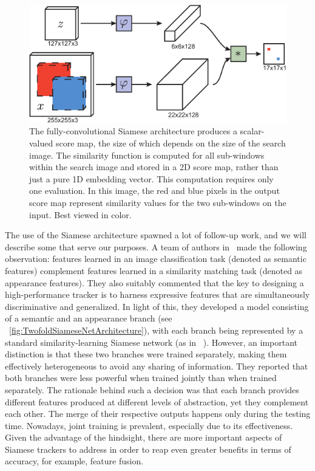 \begin{figure}[t]
    \centerline{\includegraphics[width=0.6\linewidth]{figures/theoretical_foundations/fully_cnn_siam_tracking_architecture.pdf}}
    \caption[\siamfc{} architecture]{The fully-convolutional Siamese architecture produces a scalar-valued score map, the size of which depends on the size of the search image. The similarity function is computed for all sub-windows within the search image and stored in a 2D score map, rather than just a pure 1D embedding vector. This computation requires only one evaluation. In this image, the red and blue pixels in the output score map represent similarity values for the two sub-windows on the input. Best viewed in color. }
    \label{fig:FullyCNNSiamTrackingArch}
\end{figure}

The use of the Siamese architecture spawned a lot of follow-up work, and we will describe some that serve our purposes. A team of authors in~\cite{he2018twofoldsiam} made the following observation: features learned in an image classification task (denoted as semantic features) complement features learned in a similarity matching task (denoted as appearance features). They also suitably commented that the key to designing a high-performance tracker is to harness expressive features that are simultaneously discriminative and generalized. In light of this, they developed a model consisting of a semantic and an appearance branch (see \figstr{}~\ref{fig:TwofoldSiameseNetArchitecture}), with each branch being represented by a standard similarity-learning Siamese network (as in \siamfc{}~\cite{bertinetto2016siamfc}). However, an important distinction is that these two branches were trained separately, making them effectively heterogeneous to avoid any sharing of information. They reported that both branches were less powerful when trained jointly than when trained separately. The rationale behind such a decision was that each branch provides different features produced at different levels of abstraction, yet they complement each other. The merge of their respective outputs happens only during the testing time. Nowadays, joint training is prevalent, especially due to its effectiveness. Given the advantage of the hindsight, there are more important aspects of Siamese trackers to address in order to reap even greater benefits in terms of accuracy, for example, feature fusion.


